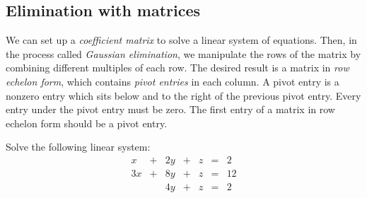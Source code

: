 \documentclass[../main.tex]{subfiles}
\begin{document}
\subsection{Elimination with matrices}

We can set up a \textit{coefficient matrix} to solve a linear system of equations.
Then, in the process called \textit{Gaussian elimination}, we manipulate the
rows of the matrix by combining different multiples of each row. The
desired result is a matrix in \textit{row echelon form}, which contains
\textit{pivot entries} in each column. A pivot entry is a nonzero entry
which sits below and to the right of the previous pivot entry.
Every entry under the pivot entry must be zero. The first entry
of a matrix in row echelon form should be a pivot entry.

\begin{example}
	Solve the following linear system:
	\[\begin{array}{rrrrrrr}
			x  & + & 2y & + & z & = & 2  \\
			3x & + & 8y & + & z & = & 12 \\
			   &   & 4y & + & z & = & 2
		\end{array}\]
\end{example}
\end{document}

